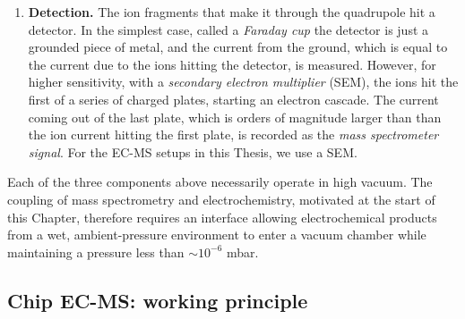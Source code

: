 \begin{enumerate}
	\item \textbf{Detection.} The ion fragments that make it through the quadrupole hit a detector. In the simplest case, called a \textit{Faraday cup} the detector is just a grounded piece of metal, and the current from the ground, which is equal to the current due to the ions hitting the detector, is measured. However, for higher sensitivity, with a \textit{secondary electron multiplier} (SEM), the ions hit the first of a series of charged plates, starting an electron cascade. The current coming out of the last plate, which is orders of magnitude larger than than the ion current hitting the first plate, is recorded as the \textit{mass spectrometer signal}. For the EC-MS setups in this Thesis, we use a SEM.
\end{enumerate}

Each of the three components above necessarily operate in high vacuum\cite{Gross2007, PfeifferKnowhow}. 
The coupling of mass spectrometry and electrochemistry, motivated at the start of this Chapter, therefore requires an interface allowing electrochemical products from a wet, ambient-pressure environment to enter a vacuum chamber while maintaining a pressure less than $\sim 10^{-6}$ mbar.

\subsection{Chip EC-MS: working principle}\label{subsec:ECMS}

